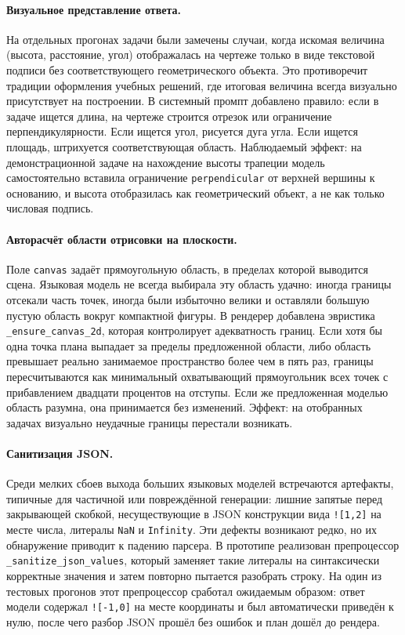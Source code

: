 \paragraph{Визуальное представление ответа.} На отдельных прогонах задачи были замечены случаи, когда искомая величина (высота, расстояние, угол) отображалась на чертеже только в виде текстовой подписи без соответствующего геометрического объекта. Это противоречит традиции оформления учебных решений, где итоговая величина всегда визуально присутствует на построении. В системный промпт добавлено правило: если в задаче ищется длина, на чертеже строится отрезок или ограничение перпендикулярности. Если ищется угол, рисуется дуга угла. Если ищется площадь, штрихуется соответствующая область. Наблюдаемый эффект: на демонстрационной задаче на нахождение высоты трапеции модель самостоятельно вставила ограничение \texttt{perpendicular} от верхней вершины к основанию, и высота отобразилась как геометрический объект, а не как только числовая подпись.

\paragraph{Авторасчёт области отрисовки на плоскости.} Поле \texttt{canvas} задаёт прямоугольную область, в пределах которой выводится сцена. Языковая модель не всегда выбирала эту область удачно: иногда границы отсекали часть точек, иногда были избыточно велики и оставляли большую пустую область вокруг компактной фигуры. В рендерер добавлена эвристика \texttt{\_ensure\_canvas\_2d}, которая контролирует адекватность границ. Если хотя бы одна точка плана выпадает за пределы предложенной области, либо область превышает реально занимаемое пространство более чем в пять раз, границы пересчитываются как минимальный охватывающий прямоугольник всех точек с прибавлением двадцати процентов на отступы. Если же предложенная моделью область разумна, она принимается без изменений. Эффект: на отобранных задачах визуально неудачные границы перестали возникать.

\paragraph{Санитизация JSON.} Среди мелких сбоев выхода больших языковых моделей встречаются артефакты, типичные для частичной или повреждённой генерации: лишние запятые перед закрывающей скобкой, несуществующие в JSON конструкции вида \verb|![1,2]| на месте числа, литералы \texttt{NaN} и \texttt{Infinity}. Эти дефекты возникают редко, но их обнаружение приводит к падению парсера. В прототипе реализован препроцессор \texttt{\_sanitize\_json\_values}, который заменяет такие литералы на синтаксически корректные значения и затем повторно пытается разобрать строку. На один из тестовых прогонов этот препроцессор сработал ожидаемым образом: ответ модели содержал \verb|![-1,0]| на месте координаты и был автоматически приведён к нулю, после чего разбор JSON прошёл без ошибок и план дошёл до рендера.

